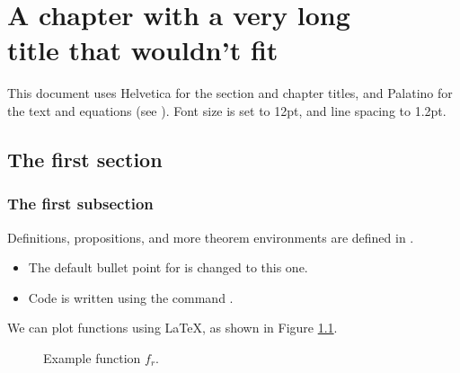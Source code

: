 \chapter[A chapter with long title]{A chapter with a very long \\ title that wouldn't fit}\label{ch:2-abm}

This document uses Helvetica for the section and chapter titles, and Palatino for the text and equations (see ). Font size is set to 12pt, and line spacing to 1.2pt.



\section{The first section}


\subsection{The first subsection}

\begin{proposition}\label{prop:example}
    Definitions, propositions, and more theorem environments are defined in .
    \begin{itemize}
        \item The default bullet point for  is changed to this one.
        \item Code is written using the command .
    \end{itemize}
\end{proposition}

We can plot functions using \LaTeX, as shown in Figure \ref{fig:example-function}.

\begin{figure}[htp]
    \centering
    \caption{Example function $f_r$.}
    \label{fig:example-function}
\end{figure}

